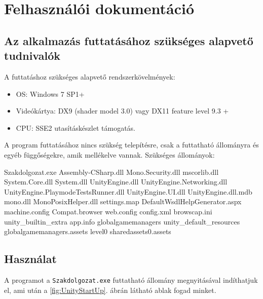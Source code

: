 \chapter*{Felhasználói dokumentáció}

\section*{Az alkalmazás futtatásához szükséges alapvető tudnivalók}

A futtatáshoz szükséges alapvető rendszerkövelmények:
\begin{itemize}
\item OS: Windows 7 SP1+
\item Videókártya: DX9 (shader model 3.0) vagy DX11 feature level 9.3 +
\item CPU: SSE2 utasításkészlet  támogatás.
\end{itemize}

\noindent A program futtatásához nincs szükség telepítésre, csak a futtatható állományra és egyéb függőségekre, amik mellékelve vannak.
\newline
\newline Szükséges állományok:
\begin{cpp}
Szakdolgozat.exe Assembly-CSharp.dll Mono.Security.dll mscorlib.dll
System.Core.dll System.dll UnityEngine.dll UnityEngine.Networking.dll
UnityEngine.PlaymodeTestsRunner.dll UnityEngine.UI.dll
UnityEngine.dll.mdb mono.dll MonoPosixHelper.dll settings.map
DefaultWsdlHelpGenerator.aspx machine.config Compat.browser
web.config config.xml browscap.ini  unity\_builtin\_extra app.info 
globalgamemanagers unity\_default\_resources
globalgamemanagers.assets level0 sharedassets0.assets
\end{cpp}

\section*{Használat}
A programot a \texttt{Szakdolgozat.exe} futtatható állomány megnyitásával indíthatjuk el, ami után a \ref{fig:UnityStartUp}. ábrán látható ablak fogad minket.

